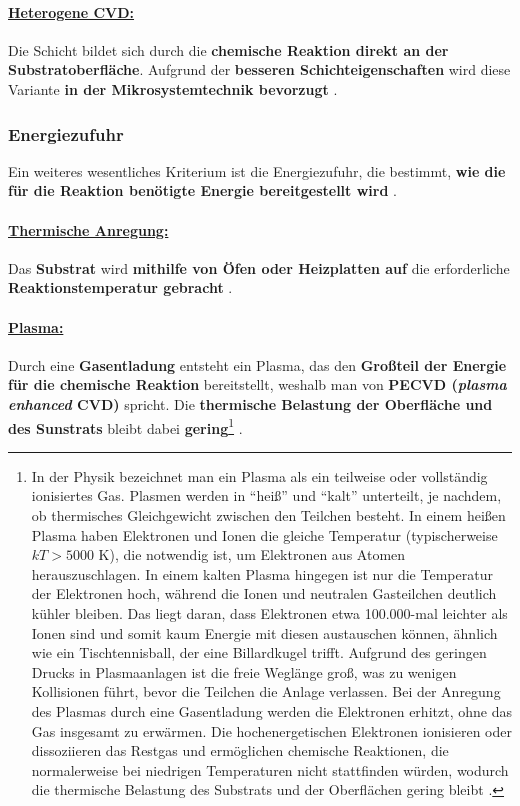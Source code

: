 \documentclass{article} %
\begin{document}
\vspace{0.0em}
\paragraph{\uline{Heterogene CVD:}} Die Schicht bildet sich durch die \textbf{chemische Reaktion direkt an der Substratoberfläche}. Aufgrund der 
\textbf{besseren Schichteigenschaften} wird diese Variante \textbf{in der Mikrosystemtechnik bevorzugt} \cite{keplinger2024CVD}.

\vspace{1em}
\subsubsection{Energiezufuhr} %
Ein weiteres wesentliches Kriterium ist die Energiezufuhr, die bestimmt, \textbf{wie die für die Reaktion benötigte Energie bereitgestellt 
wird} \cite{keplinger2024CVD}.

\vspace{0.0em}
\paragraph{\uline{Thermische Anregung:}} Das \textbf{Substrat} wird \textbf{mithilfe von Öfen oder Heizplatten auf} die erforderliche \textbf{Reaktionstemperatur 
gebracht} \cite{keplinger2024CVD}.

\vspace{0.0em}
\paragraph{\uline{Plasma:}} Durch eine \textbf{Gasentladung} entsteht ein Plasma, das den \textbf{Großteil der Energie für die chemische Reaktion} bereitstellt, 
weshalb man von \textbf{PECVD (\textit{plasma enhanced} CVD)} spricht. Die \textbf{thermische Belastung der Oberfläche und des Sunstrats} bleibt dabei 
\textbf{gering}\footnote{In der Physik bezeichnet man ein Plasma als ein teilweise oder vollständig ionisiertes Gas. Plasmen werden in ``heiß'' und ``kalt'' 
unterteilt, je nachdem, ob thermisches Gleichgewicht zwischen den Teilchen besteht. In einem heißen Plasma haben Elektronen und Ionen die gleiche Temperatur 
(typischerweise $kT > 5000$ K), die notwendig ist, um Elektronen aus Atomen herauszuschlagen. In einem kalten Plasma hingegen ist nur die Temperatur der Elektronen 
hoch, während die Ionen und neutralen Gasteilchen deutlich kühler bleiben. Das liegt daran, dass Elektronen etwa 100.000-mal leichter als Ionen sind und somit kaum 
Energie mit diesen austauschen können, ähnlich wie ein Tischtennisball, der eine Billardkugel trifft. Aufgrund des geringen Drucks in Plasmaanlagen ist die freie 
Weglänge groß, was zu wenigen Kollisionen führt, bevor die Teilchen die Anlage verlassen. Bei der Anregung des Plasmas durch eine Gasentladung werden die 
Elektronen erhitzt, ohne das Gas insgesamt zu erwärmen. Die hochenergetischen Elektronen ionisieren oder dissoziieren das Restgas und ermöglichen chemische 
Reaktionen, die normalerweise bei niedrigen Temperaturen nicht stattfinden würden, wodurch die thermische Belastung des Substrats und der Oberflächen gering 
bleibt \cite{keplinger2024CVD}.} \cite{keplinger2024CVD}.
\end{document}
